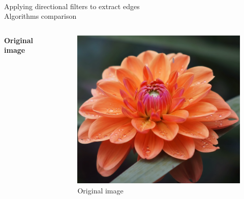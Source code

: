 \documentclass[accentcolor=tud4b,colorbacktitle,inverttitle,landscape,german,presentation,t]{tudbeamer}
\begin{document}
\begin{frame}{\\Applying directional filters to extract edges\\ \small{Algorithms comparison \cite{youtube}}}

\begin{columns}

\textbf{Original image}
\begin{figure}
\includegraphics[scale=.45]{Sobel_1}
\caption{Original image}
\end{figure}


\end{columns}
\end{frame}
\end{document}
